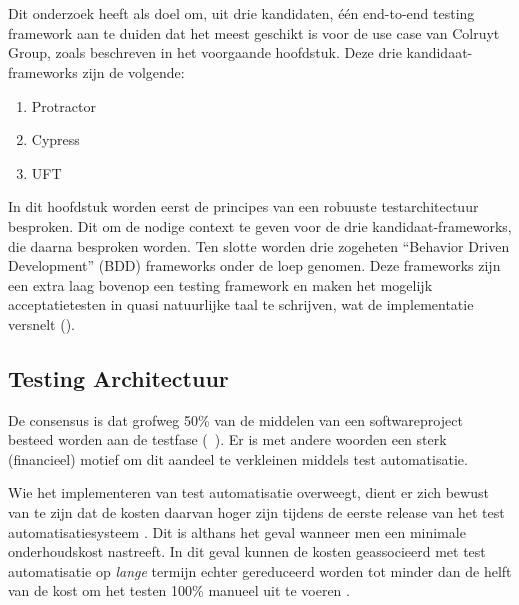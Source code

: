 \chapter{}
\label{ch:stand-van-zaken}



Dit onderzoek heeft als doel om, uit drie kandidaten, één end-to-end testing framework aan te duiden dat het meest geschikt is voor de use case van Colruyt Group, zoals beschreven in het voorgaande hoofdstuk. Deze drie kandidaat-frameworks zijn de volgende:

\begin{enumerate}
    \item Protractor
    \item Cypress
    \item UFT
\end{enumerate}

In dit hoofdstuk worden eerst de principes van een robuuste testarchitectuur besproken. Dit om de nodige context te geven voor de drie kandidaat-frameworks, die daarna besproken worden. Ten slotte worden drie zogeheten ``Behavior Driven Development'' (BDD) frameworks onder de loep genomen. Deze frameworks zijn een extra laag bovenop een testing framework en maken het mogelijk acceptatietesten in quasi natuurlijke taal te schrijven, wat de implementatie versnelt (\cite{Diepenbeck2014}).

\section{Testing Architectuur}

De consensus is dat grofweg 50\% van de middelen van een softwareproject besteed worden aan de testfase (~\cite{Kasurinen2010,Tsai2001,Dadwal2018}). Er is met andere woorden een sterk (financieel) motief om dit aandeel te verkleinen middels test automatisatie.

Wie het implementeren van test automatisatie overweegt, dient er zich bewust van te zijn dat de kosten daarvan hoger zijn tijdens de eerste release van het test automatisatiesysteem \autocite{Fewster2001} \autocite{Kumar2016}. Dit is althans het geval wanneer men een minimale onderhoudskost nastreeft. In dit geval kunnen de kosten geassocieerd met test automatisatie op \emph{lange} termijn echter gereduceerd worden tot minder dan de helft van de kost om het testen 100\% manueel uit te voeren \autocite{Kumar2016}.

